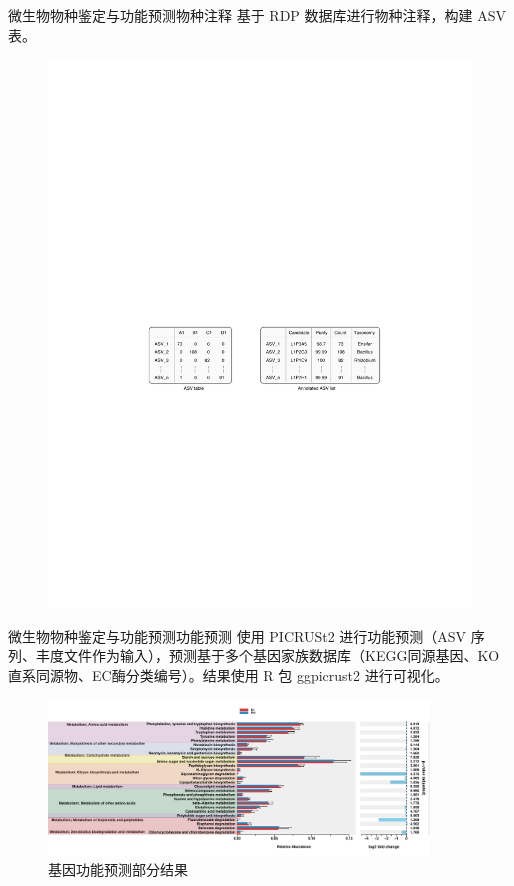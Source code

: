 \documentclass{beamer}
\begin{document}
	\begin{frame}{微生物物种鉴定与功能预测}{物种注释}
		\qquad 基于 RDP 数据库进行物种注释，构建 ASV 表。

		\begin{figure}
			\centering
			\includegraphics[width=\textwidth]{img/ASVtable.pdf}
		\end{figure}

	\end{frame}

	\begin{frame}{微生物物种鉴定与功能预测}{功能预测}
		\qquad 使用 PICRUSt2 进行功能预测（ASV 序列、丰度文件作为输入），预测基于多个基因家族数据库（KEGG同源基因、KO直系同源物、EC酶分类编号）。结果使用 R 包 ggpicrust2 进行可视化。
		\begin{figure}
			\centering
			\includegraphics[width=0.9\textwidth]{img/RelativeAbundance60.pdf}
			\caption{基因功能预测部分结果}
		\end{figure}
	\end{frame}
\end{document}
